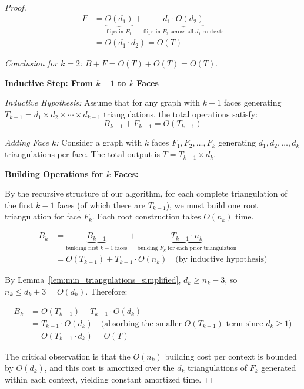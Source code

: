 ﻿﻿\documentclass[12pt,a4paper]{article}
\theoremstyle{definition}
\theoremstyle{remark}
\begin{document}
\begin{proof}
	\begin{align*}
		F & = \underbrace{O(d_1)}_{\text{flips in } F_1} + \underbrace{d_1 \cdot O(d_2)}_{\text{flips in } F_2 \text{ across all } d_1 \text{ contexts}} \\
		  & = O(d_1 \cdot d_2) = O(T)
	\end{align*}

	\textit{Conclusion for $k=2$:} $B + F = O(T) + O(T) = O(T)$.

	\vspace{0.5cm}
	\noindent\textbf{Inductive Step: From $k-1$ to $k$ Faces}

	\textit{Inductive Hypothesis:} Assume that for any graph with $k-1$ faces generating $T_{k-1} = d_1 \times d_2 \times \cdots \times d_{k-1}$ triangulations, the total operations satisfy:
	$$B_{k-1} + F_{k-1} = O(T_{k-1})$$

	\textit{Adding Face $k$:} Consider a graph with $k$ faces $F_1, F_2, \ldots, F_k$ generating $d_1, d_2, \ldots, d_k$ triangulations per face. The total output is $T = T_{k-1} \times d_k$.

	\textbf{Building Operations for $k$ Faces:}

	By the recursive structure of our algorithm, for each complete triangulation of the first $k-1$ faces (of which there are $T_{k-1}$), we must build one root triangulation for face $F_k$. Each root construction takes $O(n_k)$ time.

	\begin{align*}
		B_k & = \underbrace{B_{k-1}}_{\text{building first } k-1 \text{ faces}} + \underbrace{T_{k-1} \cdot n_k}_{\text{building } F_k \text{ for each prior triangulation}} \\
		    & = O(T_{k-1}) + T_{k-1} \cdot O(n_k) \quad \text{(by inductive hypothesis)}
	\end{align*}

	By Lemma~\ref{lem:min_triangulations_simplified}, $d_k \geq n_k - 3$, so $n_k \leq d_k + 3 = O(d_k)$. Therefore:

	\begin{align*}
		B_k & = O(T_{k-1}) + T_{k-1} \cdot O(d_k)                                                              \\
		    & = T_{k-1} \cdot O(d_k) \quad \text{(absorbing the smaller $O(T_{k-1})$ term since $d_k \geq 1$)} \\
		    & = O(T_{k-1} \cdot d_k) = O(T)
	\end{align*}

	The critical observation is that the $O(n_k)$ building cost per context is bounded by $O(d_k)$, and this cost is amortized over the $d_k$ triangulations of $F_k$ generated within each context, yielding constant amortized time.


\end{proof}
\end{document}
